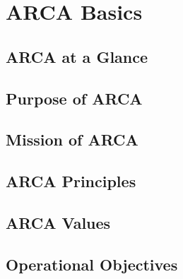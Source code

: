\documentclass[pdflatex,letterpaper,twoside,12pt]{book}
\begin{document}
\chapter{ARCA Basics}

\section{ARCA at a Glance}


\section{Purpose of ARCA}


\section{Mission of ARCA}


\section{ARCA Principles}


\section{ARCA Values}


\section{Operational Objectives}

\end{document}
